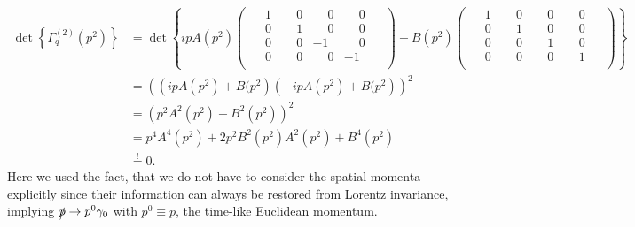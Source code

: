 \documentclass[digital, %
			   openright, %
			   parskip=half,
			   11pt]{mythesis}
\begin{document}
 \begin{equation}
\begin{aligned}
	 \det \left\{\Gamma_q^{(2)}(p^2)\right\} &= \det \left\{ipA(p^2) \begin{pmatrix}
\phantom{-}1 & \phantom{-}0 & \phantom{-}0 & \phantom{-}0\phantom{-}\\
\phantom{-}0 & \phantom{-}1 & \phantom{-}0 & \phantom{-}0\phantom{-}\\
\phantom{-}0 & \phantom{-}0 & -1 & \phantom{-}0\phantom{-}\\
\phantom{-}0 & \phantom{-}0 & \phantom{-}0 & -1\phantom{-}\\
\end{pmatrix} +  B(p^2)\begin{pmatrix}
\phantom{-}1 & \phantom{-}0 & \phantom{-}0 & \phantom{-}0\phantom{-}\\
\phantom{-}0 & \phantom{-}1 & \phantom{-}0 & \phantom{-}0\phantom{-}\\
\phantom{-}0 & \phantom{-}0 & \phantom{-}1 & \phantom{-}0\phantom{-}\\
\phantom{-}0 & \phantom{-}0 & \phantom{-}0 & \phantom{-}1\phantom{-}\\
\end{pmatrix} \right\} \\
	 &= \left(\left(ipA(p^2) + B(p^2\right)\left(-ipA(p^2) + B(p^2\right)\right)^2 \\
	 &= \left(p^2A^2(p^2) + B^2(p^2)\right)^2 \\
		&= p^4 A^4(p^2) + 2p^2B^2(p^2)A^2(p^2) + B^4(p^2)\\
		&\overset{!}{=} 0.
\end{aligned}
\end{equation}
Here we used the fact, that we do not have to consider the spatial momenta explicitly since their information can always be restored from Lorentz invariance, implying $\slashed{p} \rightarrow p^0\gamma_0$ with $p^0\equiv p$, the time-like Euclidean momentum.
\end{document}

